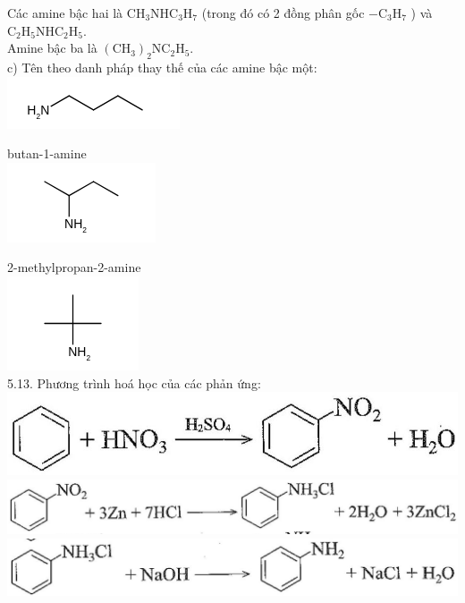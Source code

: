 \documentclass[10pt]{article}
\begin{document}
Các amine bậc hai là $\mathrm{CH}_{3} \mathrm{NHC}_{3} \mathrm{H}_{7}$ (trong đó có 2 đồng phân gốc $-\mathrm{C}_{3} \mathrm{H}_{7}$ ) và $\mathrm{C}_{2} \mathrm{H}_{5} \mathrm{NHC}_{2} \mathrm{H}_{5}$.\\
Amine bậc ba là $\left(\mathrm{CH}_{3}\right)_{2} \mathrm{NC}_{2} \mathrm{H}_{5}$.\\
c) Tên theo danh pháp thay thế của các amine bậc một:\\
\includegraphics{smile-b806194d0918c38947b60974329d1851b913633c}

butan-1-amine\\
\includegraphics{smile-5b293306429e7b131bf78d38275cc8f2d82842bb}

2-methylpropan-2-amine\\
\includegraphics{smile-ab45790aa4b14dac56d44336fe7bcc7dec8a7801}\\
5.13. Phương trình hoá học của các phản ứng:\\
\includegraphics[max width=\textwidth, center]{2025_10_23_3f52bbaab6caa9e2ff75g-06(1)}\\
\includegraphics[max width=\textwidth, center]{2025_10_23_3f52bbaab6caa9e2ff75g-06(2)}\\
\includegraphics[max width=\textwidth, center]{2025_10_23_3f52bbaab6caa9e2ff75g-06}
\end{document}

